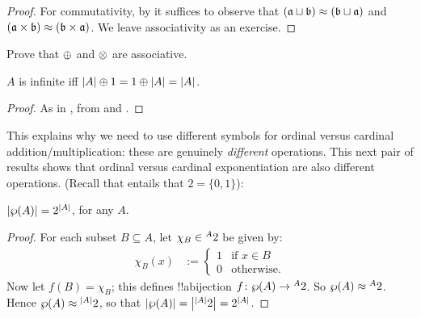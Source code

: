 \documentclass[../../../include/open-logic-section]{subfiles}
\begin{document}
\begin{proof}
For commutativity, by
 it
suffices to observe that $(\mathfrak{a} \sqcup
\mathfrak{b}) \approx (\mathfrak{b} \sqcup \mathfrak{a})$ and
$(\mathfrak{a} \times \mathfrak{b}) \approx (\mathfrak{b} \times
\mathfrak{a})$. We leave associativity as an exercise.
\end{proof}

\begin{prob}
Prove that $\oplus$ and $\otimes$ are associative.
\end{prob}

\begin{prop}
$A$ is infinite iff $\left| A \right| \oplus 1 = 1 \oplus \left| A \right| = \left| A \right|$.
\end{prop}

\begin{proof}
As in
, from
 and
. 
\end{proof}

This explains why we need to use different symbols for ordinal versus
cardinal addition/multiplication: these are genuinely \emph{different}
operations. This next pair of results shows that ordinal versus
cardinal exponentiation are also different operations. (Recall that
 entails that $2 = \{0,
1\}$):

\begin{lem}
$\left| \wp(A) \right| = 2^{\left| A \right|}$, for any $A$.
\end{lem}

\begin{proof}
For each subset $B \subseteq A$, let $\chi_B \in {}^{A}{2}$ be given by:
\begin{align*}
	\chi_{B}(x) &:=
	\begin{cases}
		1 & \text{if }x\in B\\
		0 & \text{otherwise.}
	\end{cases}
\end{align*}
Now let $f(B) = \chi_B$; this defines !!a{bijection} $f \colon \wp(A)
\to {}^{A}{2}$. So $\wp(A) \approx {}^{A}{2}$. Hence
$\wp(A) \approx {}^{\left| A \right|}{2}$, so that
$\left| \wp(A) \right| = \left| {}^{\left| A \right|}{2} \right| =
2^{\left| A \right|}$.
\end{proof}
\end{document}
